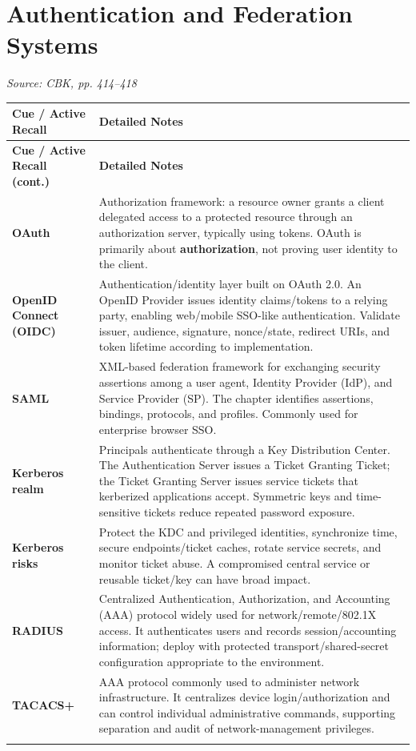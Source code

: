\documentclass[10pt,letterpaper]{article}
\makeatletter
\newenvironment{cornell}{\rowcolors{2}{white}{notebg}\begin{longtable}{@{}>{\raggedright\arraybackslash\columncolor{cuebg}\color{navy}\bfseries}p{0.285\textwidth}>{\raggedright\arraybackslash}p{0.65\textwidth}@{}}\rowcolor{navy}\color{white}\textbf{Cue / Active Recall} & \color{white}\textbf{Detailed Notes}\\ \hline\endfirsthead\rowcolor{navy}\color{white}\textbf{Cue / Active Recall (cont.)} & \color{white}\textbf{Detailed Notes}\\ \hline\endhead}{\end{longtable}}
\newcommand{\noterow}[2]{#1 & #2\\\arrayrulecolor{line}\hline}\newcommand{\source}[1]{\par{\footnotesize\color{teal}\textit{Source: CBK, #1}}\par}
\makeatother
\begin{document}
\section{\color{navy}Authentication and Federation Systems}
\source{pp. 414--418}
\begin{cornell}
\noterow{OAuth}{Authorization framework: a resource owner grants a client delegated access to a protected resource through an authorization server, typically using tokens. OAuth is primarily about \textbf{authorization}, not proving user identity to the client.}
\noterow{OpenID Connect (OIDC)}{Authentication/identity layer built on OAuth 2.0. An OpenID Provider issues identity claims/tokens to a relying party, enabling web/mobile SSO-like authentication. Validate issuer, audience, signature, nonce/state, redirect URIs, and token lifetime according to implementation.}
\noterow{SAML}{XML-based federation framework for exchanging security assertions among a user agent, Identity Provider (IdP), and Service Provider (SP). The chapter identifies assertions, bindings, protocols, and profiles. Commonly used for enterprise browser SSO.}
\noterow{Kerberos realm}{Principals authenticate through a Key Distribution Center. The Authentication Server issues a Ticket Granting Ticket; the Ticket Granting Server issues service tickets that kerberized applications accept. Symmetric keys and time-sensitive tickets reduce repeated password exposure.}
\noterow{Kerberos risks}{Protect the KDC and privileged identities, synchronize time, secure endpoints/ticket caches, rotate service secrets, and monitor ticket abuse. A compromised central service or reusable ticket/key can have broad impact.}
\noterow{RADIUS}{Centralized Authentication, Authorization, and Accounting (AAA) protocol widely used for network/remote/802.1X access. It authenticates users and records session/accounting information; deploy with protected transport/shared-secret configuration appropriate to the environment.}
\noterow{TACACS+}{AAA protocol commonly used to administer network infrastructure. It centralizes device login/authorization and can control individual administrative commands, supporting separation and audit of network-management privileges.}
\end{cornell}
\end{document}

